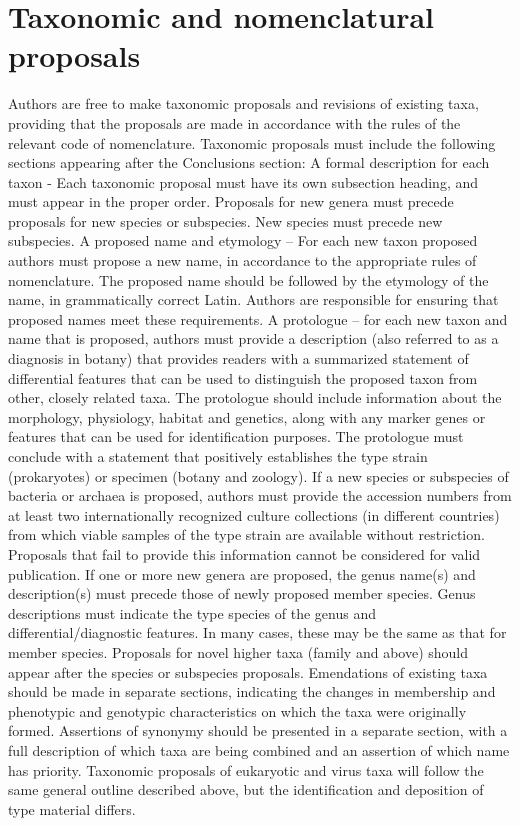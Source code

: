 \documentclass{bmcart}
\begin{document}
{%
\section*{Taxonomic and nomenclatural proposals}

Authors are free to make taxonomic proposals and revisions of existing taxa, providing that the proposals are made in accordance with the rules of the relevant code of nomenclature. Taxonomic proposals must include the following sections appearing after the Conclusions section: A formal description for each taxon - Each taxonomic proposal must have its own subsection heading, and must appear in the proper order. Proposals for new genera must precede proposals for new species or subspecies. New species must precede new subspecies. A proposed name and etymology – For each new taxon proposed authors must propose a new name, in accordance to the appropriate rules of nomenclature. The proposed name should be followed by the etymology of the name, in grammatically correct Latin. Authors are responsible for ensuring that proposed names meet these requirements.
A protologue – for each new taxon and name that is proposed, authors must provide a description (also referred to as a diagnosis in botany) that provides readers with a summarized statement of differential features that can be used to distinguish the proposed taxon from other, closely related taxa. The protologue should include information about the morphology, physiology, habitat and genetics, along with any marker genes or features that can be used for identification purposes. The protologue must conclude with a statement that positively establishes the type strain (prokaryotes) or specimen (botany and zoology). If a new species or subspecies of bacteria or archaea is proposed, authors must provide the accession numbers from at least two internationally recognized culture collections (in different countries) from which viable samples of the type strain are available without restriction. Proposals that fail to provide this information cannot be considered for valid publication. If one or more new genera are proposed, the genus name(s) and description(s) must precede those of newly proposed member species. Genus descriptions must indicate the type species of the genus and differential/diagnostic features. In many cases, these may be the same as that for member species. Proposals for novel higher taxa (family and above) should appear after the species or subspecies proposals. Emendations of existing taxa should be made in separate sections, indicating the changes in membership and phenotypic and genotypic characteristics on which the taxa were originally formed. Assertions of synonymy should be presented in a separate section, with a full description of which taxa are being combined and an assertion of which name has priority. Taxonomic proposals of eukaryotic and virus taxa will follow the same general outline described above, but the identification and deposition of type material differs.

}
\end{document}
